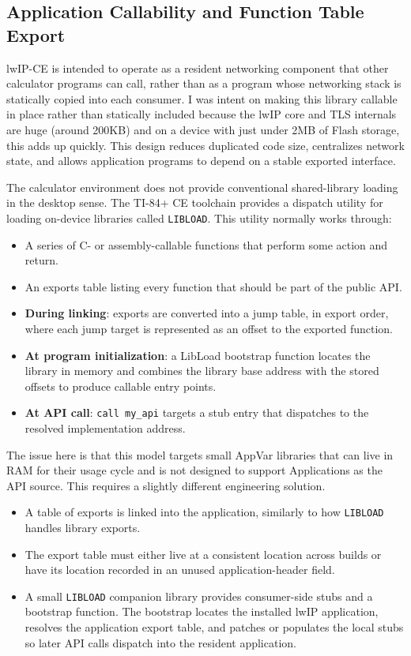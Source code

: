 \documentclass[titlepage]{report}
\begin{document}
			\subsection{Application Callability and Function Table Export}
			lwIP-CE is intended to operate as a resident networking component that other calculator programs can call, rather than as a program whose networking stack is statically copied into each consumer. I was intent on making this library callable in place rather than statically included because the lwIP core and TLS internals are huge (around 200KB) and on a device with just under 2MB of Flash storage, this adds up quickly. This design reduces duplicated code size, centralizes network state, and allows application programs to depend on a stable exported interface.
			
			The calculator environment does not provide conventional shared-library loading in the desktop sense. The TI-84+ CE toolchain provides a dispatch utility for loading on-device libraries called \texttt{LIBLOAD}. This utility normally works through:
			\begin{itemize}
				\item A series of C- or assembly-callable functions that perform some action and return.
				\item An exports table listing every function that should be part of the public API.
				\item \textbf{During linking}: exports are converted into a jump table, in export order, where each jump target is represented as an offset to the exported function.
				\item \textbf{At program initialization}: a LibLoad bootstrap function locates the library in memory and combines the library base address with the stored offsets to produce callable entry points.
				\item \textbf{At API call}: \verb|call my_api| targets a stub entry that dispatches to the resolved implementation address.
			\end{itemize}


			The issue here is that this model targets small AppVar libraries that can live in RAM for their usage cycle and is not designed to support Applications as the API source. This requires a slightly different engineering solution.

			\begin{itemize}
				\item A table of exports is linked into the application, similarly to how \texttt{LIBLOAD} handles library exports.
				\item The export table must either live at a consistent location across builds or have its location recorded in an unused application-header field.
				\item A small \texttt{LIBLOAD} companion library provides consumer-side stubs and a bootstrap function. The bootstrap locates the installed lwIP application, resolves the application export table, and patches or populates the local stubs so later API calls dispatch into the resident application.
			\end{itemize}
\end{document}
